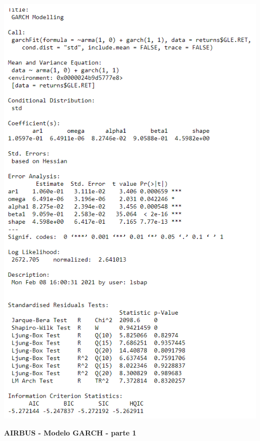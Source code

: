\documentclass[
  12pt,
  a4paper,
  openany]{book}
\theoremstyle{definition}
\theoremstyle{definition}
\theoremstyle{definition}
\theoremstyle{remark}
\begin{document}
\begin{center}
\begin{minipage}{0.90\linewidth}
    \centering
    \includegraphics[width=2\textwidth]{image/garchgle.png}
\end{minipage}
\end{center}

\newpage

\begin{center}
 {\normalfont\Large\bfseries AIRBUS - Modelo GARCH - parte 1}
\end{center}
\end{document}
